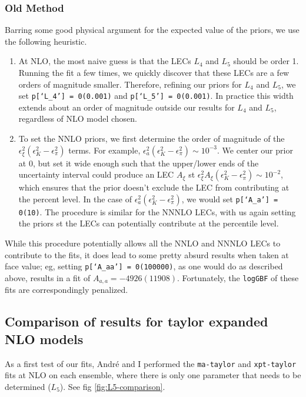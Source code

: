 \documentclass[prd,tightenlines,preprintnumbers,showpacs,superscriptaddress,notitlepage,eqsecnum,floatfix,notitlepage]{revtex4-1}
\begin{document}
\subsubsection{Old Method}
Barring some good physical argument for the expected value of the priors, we use the following heuristic.
\begin{enumerate}
	\item At NLO, the most naive guess is that the LECs $L_4$ and $L_5$ should be order 1. Running the fit a few times, we quickly discover that these LECs are a few orders of magnitude smaller. Therefore, refining our priors for $L_4$ and $L_5$, we set \texttt{p[`L\_4'] = 0(0.001)} and \texttt{p[`L\_5'] = 0(0.001)}. In practice this width extends about an order of magnitude outside our results for $L_4$ and $L_5$, regardless of NLO model chosen.

	\item To set the NNLO priors, we first determine the order of magnitude of the $\epsilon^2_\xi (\epsilon^2_K - \epsilon^2_\pi)$ terms. For example, $\epsilon^2_a (\epsilon^2_K - \epsilon^2_\pi) \sim 10^{-3}$. We center our prior at 0, but set it wide enough such that the upper/lower ends of the uncertainty interval could produce an LEC $A_\xi$ st $\epsilon^2_\xi A_\xi  (\epsilon^2_K - \epsilon^2_\pi) \sim 10^{-2}$, which ensures that the prior doesn't exclude the LEC from contributing at the percent level. In the case of $ \epsilon^2_a (\epsilon^2_K - \epsilon^2_\pi)$, we would set \texttt{p[`A\_a'] = 0(10)}. The procedure is similar for the NNNLO LECs, with us again setting the priors st the LECs can potentially contribute at the percentile level.
\end{enumerate}
While this procedure potentially allows all the NNLO and NNNLO LECs to contribute to the fits, it does lead to some pretty absurd results when taken at face value; eg, setting \texttt{p[`A\_aa'] = 0(100000)}, as one would do as described above, results in a fit of $A_{a, a} = -4926 (11908)$. Fortunately, the \texttt{logGBF} of these fits are correspondingly penalized.

\subsection{Comparison of results for taylor expanded NLO models}
As a first test of our fits, André and I performed the \texttt{ma-taylor} and \texttt{xpt-taylor} fits at NLO on each ensemble, where there is only one parameter that needs to be determined ($L_5$). See fig \ref{fig:L5-comparison}.
\end{document}
